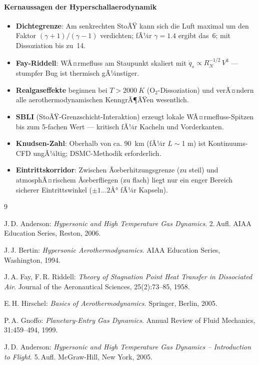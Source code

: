 ﻿\documentclass[12pt,a4paper]{article}
\begin{document}
\paragraph*{Kernaussagen der Hyperschallaerodynamik}
\begin{itemize}[leftmargin=*]
  \item \textbf{Dichtegrenze}: Am senkrechten StoÃŸ kann sich die Luft maximal
    um den Faktor $(\gamma+1)/(\gamma-1)$ verdichten; fÃ¼r $\gamma=1.4$ ergibt
    das~6; mit Dissoziation bis zu~14.
  \item \textbf{Fay-Riddell}: WÃ¤rmefluss am Staupunkt skaliert mit
    $\dot{q}_s \propto R_N^{-1/2}\,V^3$ --- stumpfer Bug ist thermisch gÃ¼nstiger.
  \item \textbf{Realgaseffekte} beginnen bei $T > \SI{2000}{K}$ (O$_2$-Dissoziation)
    und verÃ¤ndern alle aerothermodynamischen KenngrÃ¶ÃŸen wesentlich.
  \item \textbf{SBLI} (StoÃŸ-Grenzschicht-Interaktion) erzeugt lokale
    WÃ¤rmefluss-Spitzen bis zum 5-fachen Wert --- kritisch fÃ¼r Kacheln und
    Vorderkanten.
  \item \textbf{Knudsen-Zahl}: Oberhalb von ca. \SI{90}{km} (fÃ¼r $L\sim$1 m)
    ist Kontinuums-CFD ungÃ¼ltig; DSMC-Methodik erforderlich.
  \item \textbf{Eintrittskorridor}: Zwischen Ãœberhitzungsgrenze (zu steil)
    und atmosphÃ¤rischem Ãœberfliegen (zu flach) liegt nur ein enger Bereich
    sicherer Eintrittswinkel ($\pm 1\ldots2Â°$ fÃ¼r Kapseln).
\end{itemize}

\begin{thebibliography}{9}

J.\,D. Anderson:
\textit{Hypersonic and High Temperature Gas Dynamics}.
2.\,Aufl. AIAA Education Series, Reston, 2006.

J.\,J. Bertin:
\textit{Hypersonic Aerothermodynamics}.
AIAA Education Series, Washington, 1994.

J.\,A. Fay, F.\,R. Riddell:
\textit{Theory of Stagnation Point Heat Transfer in Dissociated Air}.
Journal of the Aeronautical Sciences, 25(2):73--85, 1958.

E.\,H. Hirschel:
\textit{Basics of Aerothermodynamics}.
Springer, Berlin, 2005.

P.\,A. Gnoffo:
\textit{Planetary-Entry Gas Dynamics}.
Annual Review of Fluid Mechanics, 31:459--494, 1999.

J.\,D. Anderson:
\textit{Hypersonic and High Temperature Gas Dynamics -- Introduction to Flight}.
5.\,Aufl. McGraw-Hill, New York, 2005.

\end{thebibliography}
\end{document}
